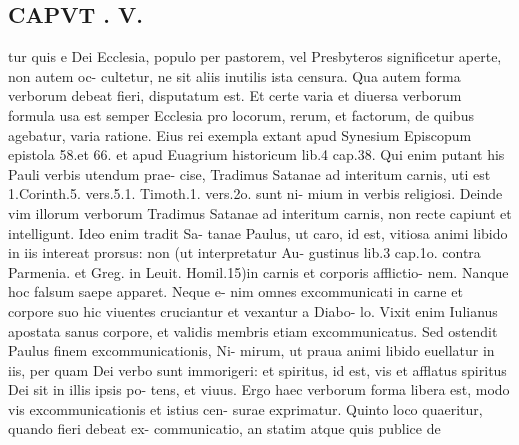 \documentclass{article}
\begin{document}
\begin{pages}
\section*{CAPVT . V. }
\marginpar{[ p.397 ]}tur quis e Dei Ecclesia, populo per pastorem, vel Presbyteros significetur aperte, non autem oc- cultetur, ne sit aliis inutilis ista censura. Qua autem forma verborum debeat fieri, disputatum est. Et certe varia et diuersa verborum formula usa est semper Ecclesia pro locorum, rerum, et factorum, de quibus agebatur, varia ratione. Eius rei exempla extant apud Synesium Episcopum epistola 58.et 66. et apud Euagrium historicum lib.4 cap.38. Qui enim putant his Pauli verbis utendum prae- cise, Tradimus Satanae ad interitum carnis, uti est 1.Corinth.5. vers.5.1. Timoth.1. vers.2o. sunt ni- mium in verbis religiosi. Deinde vim illorum verborum Tradimus Satanae ad interitum carnis, non recte capiunt et intelligunt. Ideo enim tradit Sa- tanae Paulus, ut caro, id est, vitiosa animi libido in iis intereat prorsus: non (ut interpretatur Au- gustinus lib.3 cap.1o. contra Parmenia. et Greg. in Leuit. Homil.15)in carnis et corporis afflictio- nem. Nanque hoc falsum saepe apparet. Neque e- nim omnes excommunicati in carne et corpore suo hic viuentes cruciantur et vexantur a Diabo- lo. Vixit enim Iulianus apostata sanus corpore, et validis membris etiam excommunicatus. Sed ostendit Paulus finem excommunicationis, Ni- mirum, ut praua animi libido euellatur in iis, per quam Dei verbo sunt immorigeri: et spiritus, id est, vis et afflatus spiritus Dei sit in illis ipsis po- tens, et viuus. Ergo haec verborum forma libera est, modo vis excommunicationis et istius cen- surae exprimatur. Quinto loco quaeritur, quando fieri debeat ex- communicatio, an statim atque quis publice de 

\end{pages}
\end{document}
